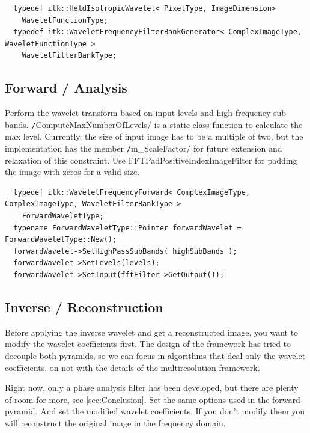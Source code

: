 \documentclass{InsightArticle}
\newcommand{\inline}[1]{\texttt/#1/}
\theoremstyle{definition}
\begin{document}
\begin{verbatim}
  typedef itk::HeldIsotropicWavelet< PixelType, ImageDimension>
    WaveletFunctionType;
  typedef itk::WaveletFrequencyFilterBankGenerator< ComplexImageType, WaveletFunctionType >
    WaveletFilterBankType;
\end{verbatim}

\subsection{Forward / Analysis}
\label{sub:Forward}
Perform the wavelet transform based on input levels and high-frequency sub bands.
\inline{ComputeMaxNumberOfLevels} is a static class function to calculate the max level.
Currently, the size of input image has to be a multiple of two, but the implementation has the member \inline {m_ScaleFactor} for future extension and relaxation of this constraint. Use FFTPadPositiveIndexImageFilter for padding the image with zeros for a valid size.

\begin{verbatim}
  typedef itk::WaveletFrequencyForward< ComplexImageType, ComplexImageType, WaveletFilterBankType >
    ForwardWaveletType;
  typename ForwardWaveletType::Pointer forwardWavelet = ForwardWaveletType::New();
  forwardWavelet->SetHighPassSubBands( highSubBands );
  forwardWavelet->SetLevels(levels);
  forwardWavelet->SetInput(fftFilter->GetOutput());
\end{verbatim}

\subsection{Inverse / Reconstruction}
\label{sub:Inverse}
Before applying the inverse wavelet and get a reconstructed image, you want to modify the wavelet coefficients first. The design of the framework has tried to decouple both pyramids, so we can focus in algorithms that deal only the wavelet coefficients, on not with the details of the multiresolution framework.\par
Right now, only a phase analysis filter has been developed, but there are plenty of room for more, see \autoref{sec:Conclusion}.
Set the same options used in the forward pyramid. And set the modified wavelet coefficients. If you don't modify them you will reconstruct the original image in the frequency domain.
\end{document}
